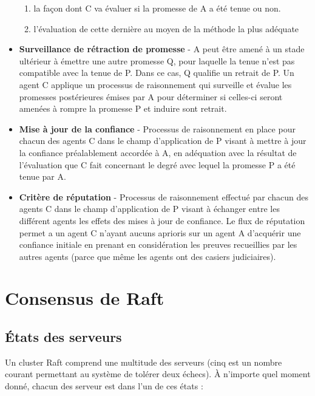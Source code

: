 \begin{itemize}
  	\begin{enumerate}
	  \item la façon dont C va évaluer si la promesse de A a été tenue ou
		  non.
      \item l'évaluation de cette dernière au moyen de la méthode la plus
          adéquate
  	\end{enumerate}
  \item \textbf{Surveillance de rétraction de promesse} -
	A peut être amené à un stade ultérieur à émettre une autre promesse Q,
	pour laquelle la tenue n'est pas compatible avec la tenue de P. Dans ce
	cas, Q qualifie un retrait de P. Un agent C applique un processus de
	raisonnement qui surveille et évalue les promesses postérieures émises
	par A pour déterminer si celles-ci seront amenées à rompre la promesse P
	et induire sont retrait.
  \item \textbf{Mise à jour de la confiance} -
	Processus de raisonnement en place pour chacun des agents C dans le champ
	d'application de P visant à mettre à jour la confiance préalablement
	accordée à A, en adéquation avec la résultat de l'évaluation que C fait
	concernant le degré avec lequel la promesse P a été tenue par A.
  \item \textbf{Critère de réputation} -
	Processus de raisonnement effectué par chacun des agents C dans le champ
	d'application de P visant à échanger entre les différent agents les
	effets des mises à jour de confiance. Le flux de réputation permet a un
	agent C n'ayant aucuns aprioris sur un agent A d'acquérir une confiance
	initiale en prenant en considération les preuves recueillies par les
    autres agents (parce que même les agents ont des casiers judiciaires).
\end{itemize}


\chapter{Consensus de Raft}
\label{appendix:consensus}

\section{États des serveurs}

Un cluster Raft comprend une multitude des serveurs (cinq est un nombre courant
permettant au système de tolérer deux échecs). À n'importe quel moment donné,
chacun des serveur est dans l'un de ces états :


